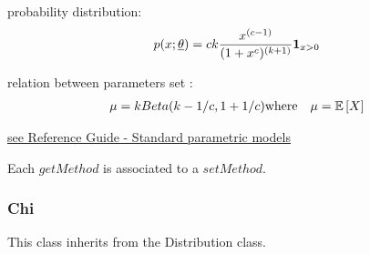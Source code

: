 \begin{description}
\begin{description}
  \end{description}

\item[Details :]  \rule{0pt}{1em}
  \begin{description}
  \item probability distribution:
    $$
    p(x;{\underline{\theta}}) = ck\frac{x^{(c-1)}}{(1+x^c)^{(k+1)}} \mathbf{1}_{x >0}
    $$
  \item relation between parameters set :
    \begin{eqnarray*}
      \mu  =   kBeta(k-1/c, 1+1/c)                                              & \mbox{where}& \mu ={\mathbb E}\left[ X \right]
    \end{eqnarray*}

  \end{description}
  \bigskip

\item[Links :]  \rule{0pt}{1em}
  \href{OpenTURNS_ReferenceGuide.pdf}{see Reference Guide - Standard parametric models}
\end{description}


Each  $getMethod$  is associated to a $setMethod$.

\newpage \subsubsection{Chi}

This class inherits from the Distribution class.

